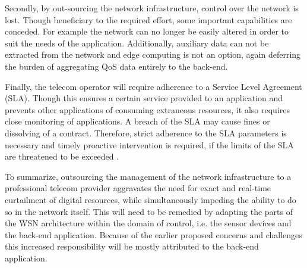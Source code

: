 Secondly, by out-sourcing the network infrastructure, control over the network is lost. Though beneficiary to the required effort, some important capabilities are conceded. For example the network can no longer be easily altered in order to suit the needs of the application. Additionally, auxiliary data can not be extracted from the network and edge computing is not an option, again deferring the burden of aggregating QoS data entirely to the back-end.

Finally, the telecom operator will require adherence to a Service Level Agreement (SLA). Though this ensures a certain service provided to an application and prevents other applications of consuming extraneous resources, it also requires close monitoring of applications. A breach of the SLA may cause fines or dissolving of a contract. Therefore, strict adherence to the SLA parameters is necessary and timely proactive intervention is required, if the limits of the SLA are threatened to be exceeded \cite{cloud_computing_monitoring}.

To summarize, outsourcing the management of the network infrastructure to a professional telecom provider aggravates the need for exact and real-time curtailment of digital resources, while simultaneously impeding the ability to do so in the network itself. This will need to be remedied by adapting the parts of the WSN architecture within the domain of control, i.e. the sensor devices and the back-end application. Because of the earlier proposed concerns and challenges this increased responsibility will be mostly attributed to the back-end application.


